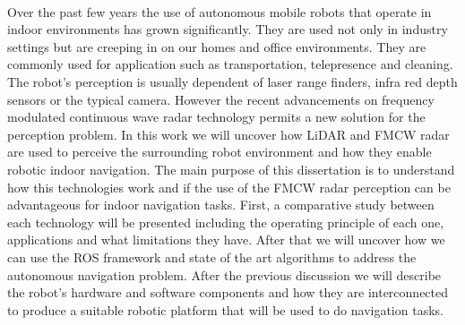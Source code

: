        
\EndTitlePage
\titlepage\ \endtitlepage %

\TitlePage
  \vspace*{55mm}
       {Over the past few years the use of autonomous mobile robots that operate in indoor environments has grown significantly. They are used not only in industry settings but are creeping in on our homes and office environments. They are commonly used for application such as transportation, telepresence and cleaning. The robot's perception is usually dependent of laser range finders, infra red depth sensors or the typical camera. However the recent advancements on frequency modulated continuous wave radar technology permits a new solution for the perception problem. In this work we will uncover how \ac{LiDAR} and \ac{FMCW} \ac{radar} are used to perceive the surrounding robot environment and how they enable robotic indoor navigation. The main purpose of this dissertation is to understand how this technologies work and if the use of the \ac{FMCW} \ac{radar} perception can be advantageous for indoor navigation tasks. 
       }
       \TEXT{}     
       {First, a comparative study between each  technology will be presented including the operating principle of each one, applications and what limitations they have. After that we will uncover how we can use the \ac{ROS} framework and state of the art algorithms  to address the autonomous navigation problem. After the previous discussion we will describe the robot's hardware and software components and how they are interconnected to produce a suitable robotic platform that will be used to do navigation tasks.
        }
